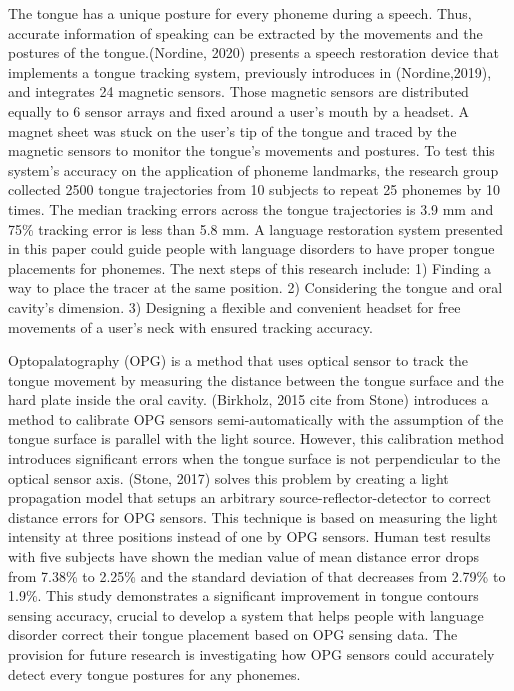 The tongue has a unique posture for every phoneme during a speech. Thus, accurate information of speaking can be extracted by the movements and the postures of the tongue.(Nordine, 2020) presents a speech restoration device that implements a tongue tracking system, previously introduces in (Nordine,2019), and integrates 24 magnetic sensors. Those magnetic sensors are distributed equally to 6 sensor arrays and fixed around a user's mouth by a headset. A magnet sheet was stuck on the user's tip of the tongue and traced by the magnetic sensors to monitor the tongue's movements and postures. To test this system's accuracy on the application of phoneme landmarks, the research group collected 2500 tongue trajectories from 10 subjects to repeat 25 phonemes by 10 times. The median tracking errors across the tongue trajectories is 3.9 mm and 75\% tracking error is less than 5.8 mm. A language restoration system presented in this paper could guide people with language disorders to have proper tongue placements for phonemes. The next steps of this research include: 1) Finding  a way to place the tracer at the same position. 2) Considering the tongue and oral cavity's dimension. 3) Designing a flexible and convenient headset for free movements of a user's neck with ensured tracking accuracy.

Optopalatography (OPG) is a method that uses optical sensor to track the tongue movement by measuring the distance between the tongue surface and the hard plate inside the oral cavity. (Birkholz, 2015 cite from Stone) introduces a method to calibrate OPG sensors semi-automatically with the assumption of the tongue surface is parallel with the light source. However, this calibration method introduces significant errors when the tongue surface is not perpendicular to the optical sensor axis. (Stone, 2017) solves this problem by creating a light propagation model that setups an arbitrary source-reflector-detector to correct distance errors for OPG sensors. This technique is based on measuring the light intensity at three positions instead of one by OPG sensors. Human test results with five subjects have shown the median value of mean distance error drops from 7.38\% to 2.25\% and the standard deviation of that decreases from 2.79\% to 1.9\%. This study demonstrates a significant improvement in tongue contours sensing accuracy, crucial to develop a system that helps people with language disorder correct their tongue placement based on OPG sensing data. The provision for future research is investigating how OPG sensors could accurately detect every tongue postures for any phonemes.

